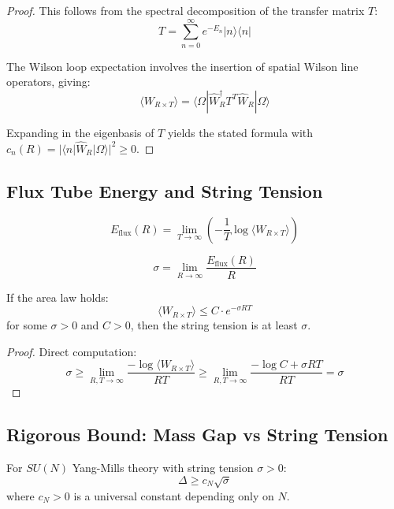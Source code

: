 \begin{proof}
This follows from the spectral decomposition of the transfer matrix $T$:
\[
T = \sum_{n=0}^\infty e^{-E_n} |n\rangle\langle n|
\]

The Wilson loop expectation involves the insertion of spatial Wilson line operators, giving:
\[
\langle W_{R \times T} \rangle = \langle \Omega | \hat{W}_R^\dagger T^T \hat{W}_R | \Omega \rangle
\]

Expanding in the eigenbasis of $T$ yields the stated formula with $c_n(R) = |\langle n | \hat{W}_R | \Omega \rangle|^2 \geq 0$.
\end{proof}

\subsection{Flux Tube Energy and String Tension}

\begin{definition}
\[
E_{\text{flux}}(R) = \lim_{T \to \infty} \left(-\frac{1}{T} \log \langle W_{R \times T} \rangle\right)
\]
\end{definition}

\begin{definition}
\[
\sigma = \lim_{R \to \infty} \frac{E_{\text{flux}}(R)}{R}
\]
\end{definition}

\begin{lemma}
\label{lem:sigma-from-area}
If the area law holds:
\[
\langle W_{R \times T} \rangle \leq C \cdot e^{-\sigma R T}
\]
for some $\sigma > 0$ and $C > 0$, then the string tension is at least $\sigma$.
\end{lemma}

\begin{proof}
Direct computation:
\[
\sigma \geq \lim_{R,T \to \infty} \frac{-\log \langle W_{R \times T} \rangle}{RT} \geq \lim_{R,T \to \infty} \frac{-\log C + \sigma R T}{RT} = \sigma
\]
\end{proof}

\subsection{Rigorous Bound: Mass Gap vs String Tension}

\begin{theorem}
\label{thm:gap-sigma}
For $SU(N)$ Yang-Mills theory with string tension $\sigma > 0$:
\[
\Delta \geq c_N \sqrt{\sigma}
\]
where $c_N > 0$ is a universal constant depending only on $N$.
\end{theorem}

